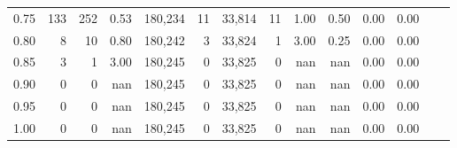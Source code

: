 \begin{tabular}{rrrrrrrrrrrrrr}
0.75 &     133 &    252 &    0.53 &  180,234 &       11 &  33,814 &      11 &  1.00 &  0.50 &  0.00 &      0.00 \\
0.80 &       8 &     10 &    0.80 &  180,242 &        3 &  33,824 &       1 &  3.00 &  0.25 &  0.00 &      0.00 \\
0.85 &       3 &      1 &    3.00 &  180,245 &        0 &  33,825 &       0 &   nan &   nan &  0.00 &      0.00 \\
0.90 &       0 &      0 &     nan &  180,245 &        0 &  33,825 &       0 &   nan &   nan &  0.00 &      0.00 \\
0.95 &       0 &      0 &     nan &  180,245 &        0 &  33,825 &       0 &   nan &   nan &  0.00 &      0.00 \\
1.00 &       0 &      0 &     nan &  180,245 &        0 &  33,825 &       0 &   nan &   nan &  0.00 &      0.00 \\
\bottomrule
\end{tabular}
